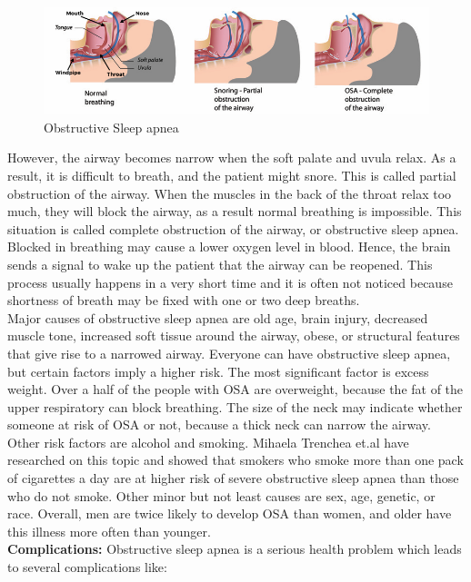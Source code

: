     \begin{figure}[h]
        \centering
        \includegraphics[width=1.0\textwidth]{Figures/ObstructionVentilationApnea.png}
        \caption{Obstructive Sleep apnea \cite{HudsonOSA}}
        \label{fig:Figures/ObstructionVentilationApnea}
    \end{figure}
    However, the airway becomes narrow when the soft palate and uvula relax. As a result, it is difficult to breath, and the patient might snore. This is called partial obstruction of the airway. When the muscles in the back of the throat relax too much, they will block the airway, as a result normal breathing is impossible. This situation is called complete obstruction of the airway, or obstructive sleep apnea. Blocked in breathing may cause a lower oxygen level in blood. Hence, the brain sends a signal to wake up the patient that the airway can be reopened. This process usually happens in a very short time and it is often not noticed because shortness of breath may be fixed with one or two deep breaths.\\ 
    Major causes of obstructive sleep apnea are old age, brain injury, decreased muscle tone, increased soft tissue around the airway, obese, or structural features that give rise to a narrowed airway\cite{OSAWiki}. Everyone can have obstructive sleep apnea, but certain factors imply a higher risk. The most significant factor is excess weight. Over a half of the people with OSA are overweight, because the fat of the upper respiratory can block breathing. The size of the neck may indicate whether someone at risk of OSA or not, because a thick neck can narrow the airway. Other risk factors are alcohol and smoking. Mihaela Trenchea et.al have researched on this topic and showed that smokers who smoke more than one pack  of cigarettes a day are at higher risk of severe obstructive sleep apnea than those who do not smoke\cite{ChestWorldCongress}. Other minor but not least causes are sex, age, genetic, or race. Overall, men are twice likely to develop OSA than women, and older have this illness more often than younger.\\
    \textbf{Complications:} Obstructive sleep apnea is a serious health problem which leads to several complications like:\\
